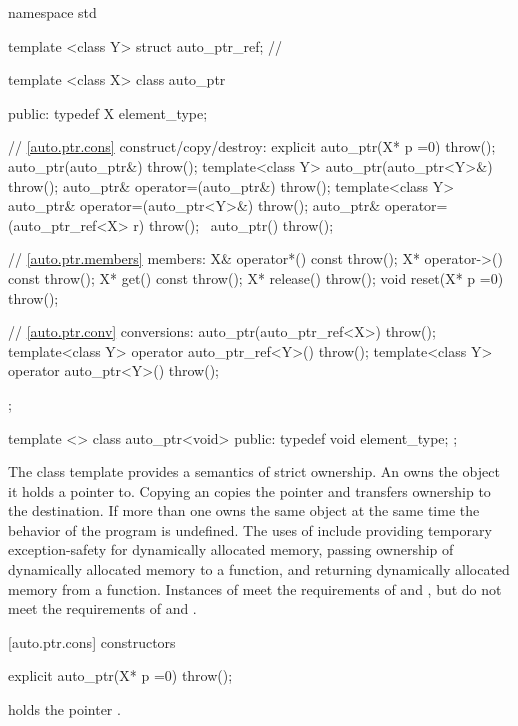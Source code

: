 \begin{codeblock}
namespace std {
  template <class Y> struct auto_ptr_ref;   // \expos

  template <class X> class auto_ptr {
  public:
    typedef X element_type;

    // \ref{auto.ptr.cons} construct/copy/destroy:
    explicit auto_ptr(X* p =0) throw();
    auto_ptr(auto_ptr&) throw();
    template<class Y> auto_ptr(auto_ptr<Y>&) throw();
    auto_ptr& operator=(auto_ptr&) throw();
    template<class Y> auto_ptr& operator=(auto_ptr<Y>&) throw();
    auto_ptr& operator=(auto_ptr_ref<X> r) throw();
   ~auto_ptr() throw();

    // \ref{auto.ptr.members} members:
    X& operator*() const throw();
    X* operator->() const throw();
    X* get() const throw();
    X* release() throw();
    void reset(X* p =0) throw();

    // \ref{auto.ptr.conv} conversions:
    auto_ptr(auto_ptr_ref<X>) throw();
    template<class Y> operator auto_ptr_ref<Y>() throw();
    template<class Y> operator auto_ptr<Y>() throw();
  };

  template <> class auto_ptr<void>
  {
  public:
    typedef void element_type;
  };
}
\end{codeblock}

\pnum
The class template  provides a semantics of strict ownership. An 
owns the object it holds a pointer to. Copying an  copies the
pointer and transfers ownership to the destination. If more than one
 owns the same object at the same time the behavior of the
program is undefined.
\enternote
The uses of  include providing temporary exception-safety
for dynamically allocated memory, passing ownership of dynamically allocated
memory to a function, and returning dynamically allocated memory from a function.
Instances of  meet the requirements of  and , but do not meet the requirements of  and .
\exitnote

[auto.ptr.cons]{ constructors}

%
\begin{itemdecl}
explicit auto_ptr(X* p =0) throw();
\end{itemdecl}

\begin{itemdescr}
\pnum
\postconditions
{} holds the pointer .
\end{itemdescr}

